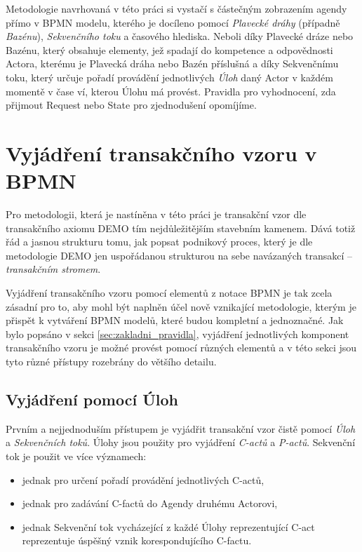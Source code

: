 \documentclass[]{article}
\begin{document}
Metodologie navrhovaná v této práci si vystačí s částečným zobrazením agendy přímo v BPMN modelu, kterého je docíleno pomocí \textit{Plavecké dráhy} (případně \textit{Bazénu}), \textit{Sekvenčního toku} a časového hlediska. Neboli díky Plavecké dráze nebo Bazénu, který obsahuje elementy, jež spadají do kompetence a odpovědnosti Actora, kterému je Plavecká dráha nebo Bazén příslušná a díky Sekvenčnímu toku, který určuje pořadí provádění jednotlivých \textit{Úloh} daný Actor v každém momentě v čase ví, kterou Úlohu má provést. Pravidla pro vyhodnocení, zda přijmout Request nebo State pro zjednodušení opomíjíme.

\section{Vyjádření transakčního vzoru v BPMN}
Pro metodologii, která je nastíněna v této práci je transakční vzor dle transakčního axiomu DEMO tím nejdůležitějším stavebním kamenem. Dává totiž řád a jasnou strukturu tomu, jak popsat podnikový proces, který je dle metodologie DEMO jen uspořádanou strukturou na sebe navázaných transakcí – \textit{transakčním stromem}.

Vyjádření transakčního vzoru pomocí elementů z notace BPMN je tak zcela zásadní pro to, aby mohl být naplněn účel nově vznikající metodologie, kterým je přispět k vytváření BPMN modelů, které budou kompletní a jednoznačné. Jak bylo popsáno v sekci \ref{sec:zakladni_pravidla}, vyjádření jednotlivých komponent transakčního vzoru je možné provést pomocí různých elementů a v této sekci jsou tyto různé přístupy rozebrány do většího detailu. 

\subsection{Vyjádření pomocí Úloh}
Prvním a nejjednoduším přístupem je vyjádřit transakční vzor čistě pomocí \textit{Úloh} a \textit{Sekvenčních toků}. Úlohy jsou použity pro vyjádření \textit{C-actů} a \textit{P-actů}. Sekvenční tok je použit ve více významech:

\begin{itemize}
\item jednak pro určení pořadí provádění jednotlivých C-actů,
\item jednak pro zadávání C-factů do Agendy druhému Actorovi,
\item jednak Sekvenční tok vycházející z každé Úlohy reprezentující C-act reprezentuje úspěšný vznik korespondujícího C-factu.
\end{itemize}
\end{document}
